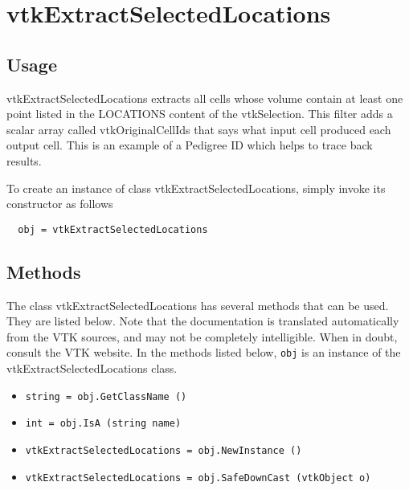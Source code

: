 \section{vtkExtractSelectedLocations}

\subsection{Usage}

 vtkExtractSelectedLocations extracts all cells whose volume contain at least 
 one point listed in the LOCATIONS content of the vtkSelection. This filter 
 adds a scalar array called vtkOriginalCellIds that says what input cell 
 produced each output cell. This is an example of a Pedigree ID which helps
 to trace back results.

To create an instance of class vtkExtractSelectedLocations, simply
invoke its constructor as follows
\begin{verbatim}
  obj = vtkExtractSelectedLocations
\end{verbatim}
\subsection{Methods}

The class vtkExtractSelectedLocations has several methods that can be used.
  They are listed below.
Note that the documentation is translated automatically from the VTK sources,
and may not be completely intelligible.  When in doubt, consult the VTK website.
In the methods listed below, \verb|obj| is an instance of the vtkExtractSelectedLocations class.
\begin{itemize}
\item  \verb|string = obj.GetClassName ()|

\item  \verb|int = obj.IsA (string name)|

\item  \verb|vtkExtractSelectedLocations = obj.NewInstance ()|

\item  \verb|vtkExtractSelectedLocations = obj.SafeDownCast (vtkObject o)|

\end{itemize}
